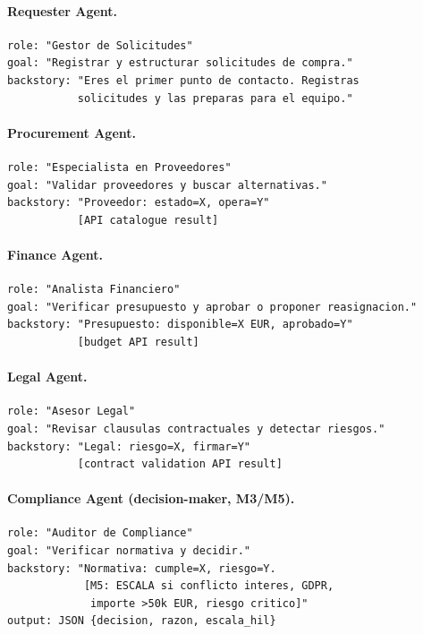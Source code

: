 \documentclass[preprint,12pt,authoryear]{elsarticle}
\begin{document}
\paragraph{Requester Agent.}
\begin{lstlisting}[language={}]
role: "Gestor de Solicitudes"
goal: "Registrar y estructurar solicitudes de compra."
backstory: "Eres el primer punto de contacto. Registras
           solicitudes y las preparas para el equipo."
\end{lstlisting}

\paragraph{Procurement Agent.}
\begin{lstlisting}[language={}]
role: "Especialista en Proveedores"
goal: "Validar proveedores y buscar alternativas."
backstory: "Proveedor: estado=X, opera=Y"
           [API catalogue result]
\end{lstlisting}

\paragraph{Finance Agent.}
\begin{lstlisting}[language={}]
role: "Analista Financiero"
goal: "Verificar presupuesto y aprobar o proponer reasignacion."
backstory: "Presupuesto: disponible=X EUR, aprobado=Y"
           [budget API result]
\end{lstlisting}

\paragraph{Legal Agent.}
\begin{lstlisting}[language={}]
role: "Asesor Legal"
goal: "Revisar clausulas contractuales y detectar riesgos."
backstory: "Legal: riesgo=X, firmar=Y"
           [contract validation API result]
\end{lstlisting}

\paragraph{Compliance Agent (decision-maker, M3/M5).}
\begin{lstlisting}[language={}]
role: "Auditor de Compliance"
goal: "Verificar normativa y decidir."
backstory: "Normativa: cumple=X, riesgo=Y.
            [M5: ESCALA si conflicto interes, GDPR,
             importe >50k EUR, riesgo critico]"
output: JSON {decision, razon, escala_hil}
\end{lstlisting}
\end{document}
